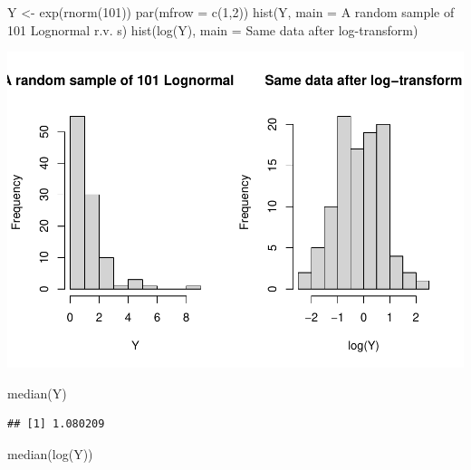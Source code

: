 \documentclass[
]{book}
\newenvironment{Shaded}{\begin{snugshade}}{\end{snugshade}}
\newcommand{\AttributeTok}[1]{\textcolor[rgb]{0.77,0.63,0.00}{#1}}
\newcommand{\DecValTok}[1]{\textcolor[rgb]{0.00,0.00,0.81}{#1}}
\newcommand{\FunctionTok}[1]{\textcolor[rgb]{0.00,0.00,0.00}{#1}}
\newcommand{\NormalTok}[1]{#1}
\newcommand{\OtherTok}[1]{\textcolor[rgb]{0.56,0.35,0.01}{#1}}
\newcommand{\StringTok}[1]{\textcolor[rgb]{0.31,0.60,0.02}{#1}}
\begin{document}
\begin{Shaded}
\begin{Highlighting}[]
\NormalTok{Y }\OtherTok{\textless{}{-}} \FunctionTok{exp}\NormalTok{(}\FunctionTok{rnorm}\NormalTok{(}\DecValTok{101}\NormalTok{))}
\FunctionTok{par}\NormalTok{(}\AttributeTok{mfrow =} \FunctionTok{c}\NormalTok{(}\DecValTok{1}\NormalTok{,}\DecValTok{2}\NormalTok{))}
\FunctionTok{hist}\NormalTok{(Y, }\AttributeTok{main =} \StringTok{\textquotesingle{}A random sample of 101 Lognormal r.v. s\textquotesingle{}}\NormalTok{)}
\FunctionTok{hist}\NormalTok{(}\FunctionTok{log}\NormalTok{(Y), }\AttributeTok{main =} \StringTok{\textquotesingle{}Same data after log{-}transform\textquotesingle{}}\NormalTok{)}
\end{Highlighting}
\end{Shaded}

\includegraphics{04-Non-Normal-Responses_files/figure-latex/unnamed-chunk-1-1.pdf}

\begin{Shaded}
\begin{Highlighting}[]
\FunctionTok{median}\NormalTok{(Y)}
\end{Highlighting}
\end{Shaded}

\begin{verbatim}
## [1] 1.080209
\end{verbatim}

\begin{Shaded}
\begin{Highlighting}[]
\FunctionTok{median}\NormalTok{(}\FunctionTok{log}\NormalTok{(Y))}
\end{Highlighting}
\end{Shaded}
\end{document}
